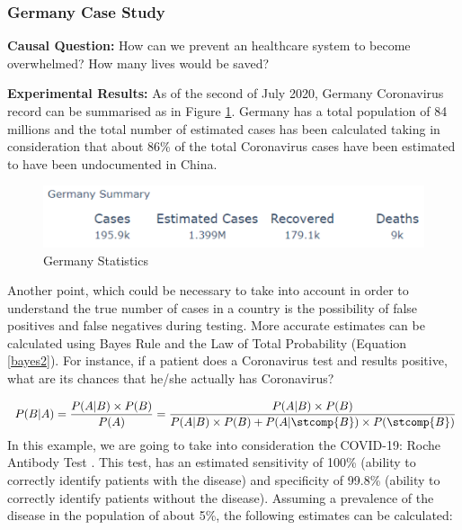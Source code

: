 \subsubsection{Germany Case Study}

\textbf{Causal Question:} How can we prevent an healthcare system to become overwhelmed? How many lives would be saved?

\textbf{Experimental Results:} As of the second of July 2020, Germany Coronavirus record can be summarised as in Figure \ref{germ}. Germany has a total population of 84 millions and the total number of estimated cases has been calculated taking in consideration that about 86\% of the total Coronavirus cases have been estimated to have been undocumented \cite{cases_paper} in China.

\begin{figure}[ht!]%
    \centering
    \includegraphics[width=0.85\linewidth]{latex/images/cov_g.pdf}
    \vspace{-0.2cm}
    \caption{Germany Statistics}
    \label{germ}
    \vspace{-0.2cm}
\end{figure}
\vspace{-0.5cm}
Another point, which could be necessary to take into account in order to understand the true number of cases in a country is the possibility of false positives and false negatives during testing. More accurate estimates can be calculated using Bayes Rule and the Law of Total Probability (Equation \ref{bayes2}). For instance, if a patient does a Coronavirus test and results positive, what are its chances that he/she actually has Coronavirus?

\useshortskip
\begin{align}
\ P(B|A) = \frac{P(A|B)\times P(B)}{P(A)} = \frac{P(A|B)\times P(B)}{P(A|B)\times P(B) + P(A|\stcomp{B})\times P(\stcomp{B})}
\label{bayes2}
\end{align}
\useshortskip
In this example, we are going to take into consideration the COVID-19: Roche Antibody Test \cite{roche}. This test, has an estimated sensitivity of 100\% (ability to correctly identify patients with the disease) and specificity of 99.8\% (ability to correctly identify patients without the disease). Assuming a prevalence of the disease in the population of about 5\%, the following estimates can be calculated:

